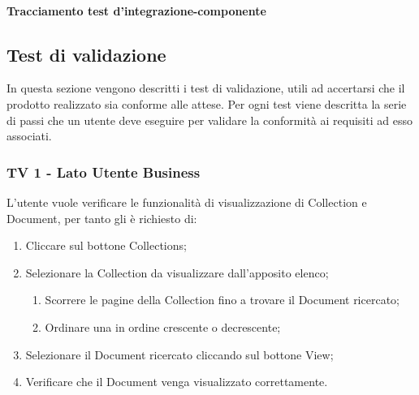 \vspace{5cm}

\paragraph{Tracciamento test d'integrazione-componente}


\subsection{Test di validazione}
In questa sezione vengono descritti i test di validazione, utili ad accertarsi che il prodotto realizzato sia conforme alle attese.
Per ogni test viene descritta la serie di passi che un utente deve eseguire per validare la conformità ai requisiti ad esso associati.

\subsubsection{TV 1 - Lato Utente Business}

L'utente vuole verificare le funzionalità di visualizzazione di Collection e Document, per tanto gli è richiesto di:


\begin{enumerate}
\item Cliccare sul bottone Collections;
\item Selezionare la Collection da visualizzare dall'apposito elenco;
\begin{enumerate}
\item Scorrere le pagine della Collection fino a trovare il Document ricercato;
\item Ordinare una  in ordine crescente o decrescente;
\end{enumerate}
\item Selezionare il Document ricercato cliccando sul bottone View;
\item Verificare che il Document venga visualizzato correttamente.
\end{enumerate}

